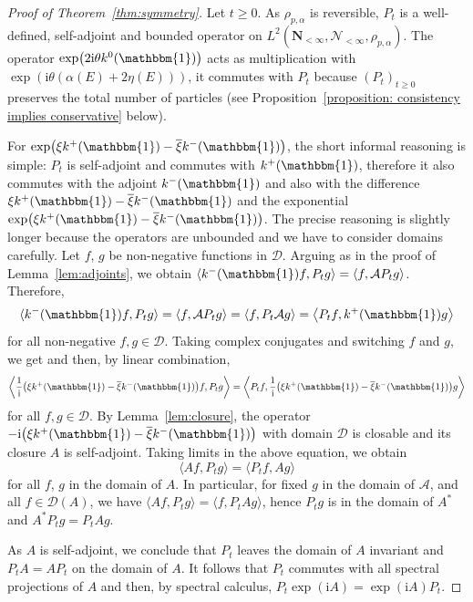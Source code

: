 \documentclass[11pt]{article}
\numberwithin{equation}{section}
\numberwithin{equation}{section}
\newcommand{\1}{\mathbbm{1}}
\begin{document}
\begin{proof}[Proof of Theorem~\ref{thm:symmetry}]
	Let $t \geq 0$. As $\rho_{p,\alpha}$ is reversible, $P_t$ is a well-defined, self-adjoint and bounded operator on $L^2(\mathbf N_{<\infty}, \mathcal N_{<\infty}, \rho_{p, \alpha})$. The operator $\exp\bigl(2 \mathrm i \theta k^0(\1)\bigr)$ acts as multiplication with $\exp( \mathrm i \theta (\alpha(E) + 2\eta(E)))$, it commutes with $P_t$ because $(P_t)_{t \geq 0}$ preserves the total number of particles (see Proposition~\ref{proposition: consistency implies conservative} below).
	
		For $\exp\bigl( \xi k^+(\1) - \overline{\xi} k^-(\1)\bigr)$, the short informal reasoning is simple: $P_t$ is self-adjoint and commutes with $k^+(\1)$, therefore it also commutes with the adjoint $k^-(\1)$ and also with the difference $\xi k^+(\1) - \overline{\xi} k^-(\1)$ and the exponential $\exp\bigl( \xi k^+(\1) - \overline{\xi} k^-(\1)\bigr)$. The precise reasoning is slightly longer because the operators are unbounded and we have to consider domains carefully. Let $f$, $g$ be non-negative functions in $\mathcal D$. Arguing as in the proof of Lemma~\ref{lem:adjoints}, we obtain $\langle k^-(\1) f, P_t g\rangle = \langle f, \mathcal A P_t g \rangle$. Therefore,
	\[
		\langle k^-(\1) f, P_t g\rangle = \langle f, \mathcal A P_t g \rangle = \langle f, P_t \mathcal A g\rangle = \bigl\langle P_t f, k^+(\1) g\bigr\rangle
	\]
	for all non-negative $f,g\in \mathcal D$. 	Taking complex conjugates and switching $f$ and $g$, we get \smash{$\bigl\langle k^+(\1) f, P_t g \bigr\rangle = \langle P_t f, k^-(\1) g\rangle $} and then, by linear combination,
	\[
		\biggl \langle \frac 1{\mathrm i} \bigl(\xi k^+(\1) - \overline{\xi} k^-(\1)\bigr) f, P_t g\biggr \rangle =
		\biggl \langle P_t f, \frac 1{\mathrm i} \bigl(\xi k^+(\1) - \overline{\xi} k^-(\1)\bigr) g\biggr \rangle
	\]
	for all $f,g\in \mathcal D$. By Lemma~\ref{lem:closure}, the operator $- \mathrm {i}\bigl(\xi k^+(\1) - \overline{\xi} k^-(\1) \bigr)$ with domain $\mathcal D$ is closable and its closure $A$ is self-adjoint. 	
	Taking limits in the above equation, we obtain
	\[
		\langle A f, P_t g \rangle = \langle P_t f, A g\rangle
	\]
	for all $f$, $g$ in the domain of $A$. In particular, for fixed $g$ in the domain of $\mathcal A$, and all $f\in \mathcal D(A)$, we have $\langle A f, P_t g\rangle = \langle f, P_t A g \rangle$, hence $P_tg$ is in the domain of $A^*$ and $A^* P_t g = P_t A g$.
	
	As $A$ is self-adjoint, we conclude that $P_t$ leaves the domain of $A$ invariant and $P_t A = A P_t$ on the domain of $A$.
It follows that $P_t$ commutes with all spectral projections of $A$ \cite[Proposition~5.26]{schmudgen2012unbounded} and then, by spectral calculus, $P_t \exp(\mathrm i A) = \exp(\mathrm i A) P_t$. 	
\end{proof}
\end{document}
